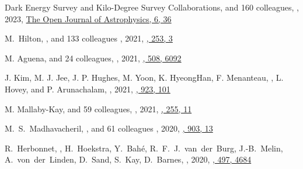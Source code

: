 \begin{etaremune}
\item
Dark Energy Survey and Kilo-Degree Survey Collaborations, and 160 colleagues,
,
2023, \href{https://ui.adsabs.harvard.edu/abs/2023OJAp....6E..36D}{The Open Journal of Astrophysics, 6, 36}

\item
M.~Hilton, \myself, and 133 colleagues
,
2021, \href{https://ui.adsabs.harvard.edu/abs/2021ApJS..253....3H/abstract}{\apjs, 253, 3}

\item
M. Aguena, and 24 colleagues,
,
2021, \href{https://ui.adsabs.harvard.edu/abs/2021MNRAS.508.6092A}{\mnras, 508, 6092}

\item
J. Kim, M. J. Jee, J. P. Hughes, M. Yoon, K. HyeongHan, F. Menanteau, \myself, L. Hovey, and P. Arunachalam,
,
2021, \href{https://ui.adsabs.harvard.edu/abs/2021ApJ...923..101K}{\apj, 923, 101}

\item
M. Mallaby-Kay, and 59 colleagues,
,
2021, \href{https://ui.adsabs.harvard.edu/abs/2021ApJS..255...11M}{\apjs, 255, 11}

\item
M.~S.~Madhavacheril, \myself, and 61 colleagues
,
2020, \href{https://ui.adsabs.harvard.edu/abs/2020ApJ...903L..13M/abstract}{\apjl, 903, 13}

\item
R.~Herbonnet, \myself, H.~Hoekstra, Y.~Bah\'e, R.~F.~J.~van~der~Burg, 
J.-B.~Melin, A.~von~der~Linden, D.~Sand, S.~Kay, D.~Barnes,
,
2020, \href{https://ui.adsabs.harvard.edu/abs/2020MNRAS.497.4684H/abstract}{\mnras, 497, 4684}


\end{etaremune}

